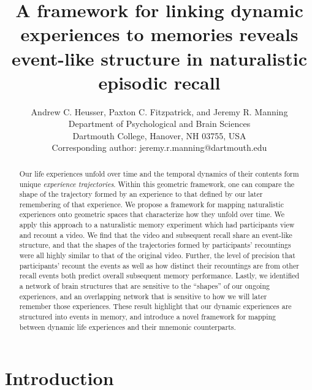 \documentclass{article}
\title{A framework for linking dynamic experiences to memories reveals event-like structure in naturalistic episodic recall}
\author{Andrew C. Heusser, Paxton C. Fitzpatrick, and Jeremy R. Manning\\Department of Psychological and Brain Sciences\\Dartmouth College, Hanover, NH 03755, USA\\Corresponding author: jeremy.r.manning@dartmouth.edu}
\begin{document}
\maketitle

\begin{abstract}
Our life experiences unfold over time and the temporal dynamics of their contents form unique \textit{experience trajectories}.  Within this geometric framework, one can compare the shape of the trajectory formed by an experience to that defined by our later remembering of that experience.  We propose a framework for mapping naturalistic experiences onto geometric spaces that characterize how they unfold over time.  We apply this approach to a naturalistic memory experiment which had participants view and recount a video.  We find that the video and subsequent recall share an event-like structure, and that the shapes of the trajectories formed by participants' recountings were all highly similar to that of the original video. Further, the level of precision that participants' recount the events as well as how distinct their recountings are from other recall events both predict overall subsequent memory performance. Lastly, we identified a network of brain structures that are sensitive to the ``shapes'' of our ongoing experiences, and an overlapping network that is sensitive to how we will later remember those experiences. These result highlight that our dynamic experiences are structured into events in memory, and introduce a novel framework for mapping between dynamic life experiences and their mnemonic counterparts.
\end{abstract}


\section*{Introduction}
\end{document}
